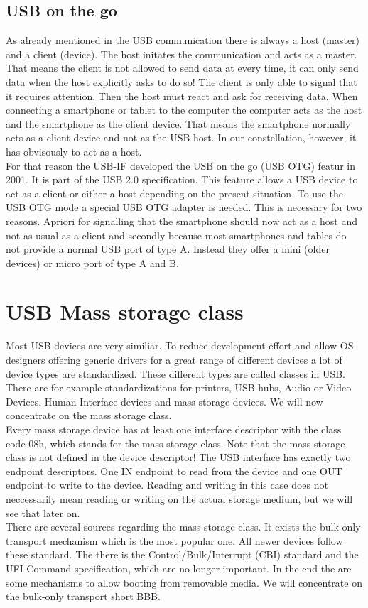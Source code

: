 \subsection{USB on the go}

As already mentioned in the USB communication there is always a host (master) and a client (device). The host initates the communication and acts as a master. That means the client is not allowed to send data at every time, it can only send data when the host explicitly asks to do so! The client is only able to signal that it requires attention. Then the host must react and ask for receiving data. When connecting a smartphone or tablet to the computer the computer acts as the host and the smartphone as the client device. That means the smartphone normally acts as a client device and not as the USB host. In our constellation, however, it has obvisously to act as a host. \\
For that reason the USB-IF developed the USB on the go (USB OTG) featur in 2001. It is part of the USB 2.0 specification. This feature allows a USB device to act as a client or either a host depending on the present situation. To use the USB OTG mode a special USB OTG adapter is needed. This is necessary for two reasons. Apriori for signalling that the smartphone should now act as a host and not as usual as a client and secondly because most smartphones and tables do not provide a normal USB port of type A. Instead they offer a mini (older devices) or micro port of type A and B. 

\section{USB Mass storage class}

Most USB devices are very similiar. To reduce development effort and allow OS designers offering generic drivers for a great range of different devices a lot of device types are standardized. These different types are called classes in USB. There are for example standardizations for printers, USB hubs, Audio or Video Devices, Human Interface devices and mass storage devices. We will now concentrate on the mass storage class.\\
Every mass storage device has at least one interface descriptor with the class code 08h, which stands for the mass storage class. Note that the mass storage class is not defined in the device descriptor! The USB interface has exactly two endpoint descriptors. One IN endpoint to read from the device and one OUT endpoint to write to the device. Reading and writing in this case does not neccessarily mean reading or writing on the actual storage medium, but we will see that later on.\\
There are several sources regarding the mass storage class. It exists the bulk-only transport mechanism which is the most popular one. All newer devices follow these standard. The there is the Control/Bulk/Interrupt (CBI) standard and the UFI Command specification, which are no longer important. In the end the are some mechanisms to allow booting from removable media. We will concentrate on the bulk-only transport short BBB.

